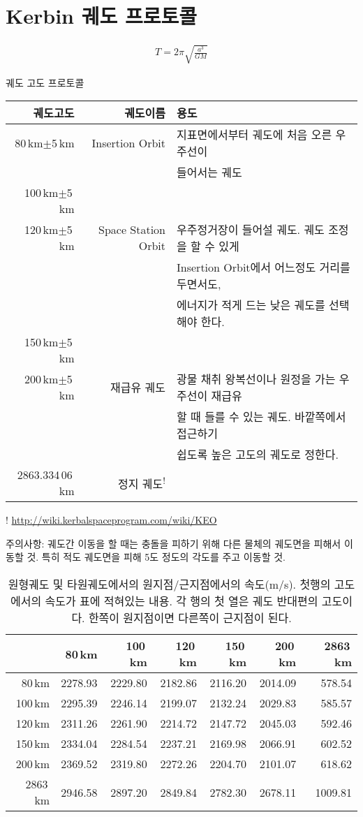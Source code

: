 \section{Kerbin 궤도 프로토콜}
\begin{align}
T = 2\pi \sqrt{\frac{a^3}{GM}}
\end{align}
\begin{threeparttable}
\caption{궤도 고도 프로토콜}
\begin{tabular}{|r|r|l|}
\hline
궤도고도 & 궤도이름& 용도
\\\hline
80\,km$\pm$5\,km&Insertion Orbit& 지표면에서부터 궤도에 처음 오른 우주선이 
\\&&들어서는 궤도
\\100\,km$\pm$5\,km&&
\\120\,km$\pm$5\,km&Space Station Orbit& 우주정거장이 들어설 궤도. 궤도 조정을 할 수 있게 
\\&&
Insertion Orbit에서 어느정도 거리를 두면서도,
\\&&
 에너지가 적게 드는 낮은 궤도를 선택해야 한다.
\\150\,km$\pm$5\,km&&
\\200\,km$\pm$5\,km&재급유 궤도& 광물 채취 왕복선이나 원정을 가는 우주선이 재급유
\\&&
 할 때 들를 수 있는 궤도. 바깥쪽에서 접근하기 
 \\&&
쉽도록 높은 고도의 궤도로 정한다.
\\2863.334\,06\,km&정지 궤도\textsuperscript{!}&
\\\hline
\end{tabular}
\begin{tablenotes}
\item[!] \url{http://wiki.kerbalspaceprogram.com/wiki/KEO}
\item[주의사항:] 궤도간 이동을 할 때는 충돌을 피하기 위해 다른 물체의 궤도면을 피해서 이동할 것. 특히 적도 궤도면을 피해 5도 정도의 각도를 주고 이동할 것.
\end{tablenotes}
\end{threeparttable}
\begin{table}
\caption{원형궤도 및 타원궤도에서의 원지점/근지점에서의 속도(m/s). 첫행의 고도에서의 속도가 표에 적혀있는 내용. 각 행의 첫 열은 궤도 반대편의 고도이다. 한쪽이 원지점이면 다른쪽이 근지점이 된다.}
\begin{tabular}{|r|r|r|r|r|r|r|}
\hline
&80\,km&100\,km&120\,km&150\,km&200\,km&2863\,km
\\\hline
80\,km&2278.93&2229.80&2182.86&2116.20&2014.09&578.54%
\\\hline
100\,km&2295.39&2246.14&2199.07&2132.24&2029.83&585.57%
\\\hline
120\,km&2311.26&2261.90&2214.72&2147.72&2045.03&592.46%
\\\hline
150\,km&2334.04&2284.54&2237.21&2169.98&2066.91&602.52%
\\\hline
200\,km&2369.52&2319.80&2272.26&2204.70&2101.07&618.62%
\\\hline
2863\,km&2946.58&2897.20&2849.84&2782.30&2678.11&1009.81
\end{tabular}
\end{table}
